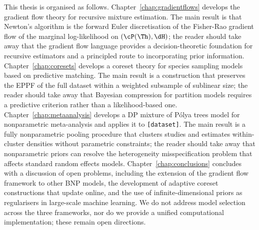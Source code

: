 This thesis is organised as follows.
Chapter~\ref{chap:gradientflows} develops the gradient flow theory for
recursive mixture estimation.  The main result is that Newton's algorithm
is the forward Euler discretisation of the Fisher-Rao gradient flow of the
marginal log-likelihood on $(\cP(\Th), \dH)$; the reader should take away
that the gradient flow language provides a decision-theoretic foundation
for recursive estimators and a principled route to incorporating prior
information.
Chapter~\ref{chap:coresets} develops a coreset theory for species sampling
models based on predictive matching.  The main result is a construction
that preserves the EPPF of the full dataset within a weighted subsample of
sublinear size; the reader should take away that Bayesian compression for
partition models requires a predictive criterion rather than a
likelihood-based one.
Chapter~\ref{chap:metaanalysis} develops a DP mixture of P\'{o}lya trees
model for nonparametric meta-analysis and applies it to \texttt{[dataset]}.
The main result is a fully nonparametric pooling procedure that clusters
studies and estimates within-cluster densities without parametric
constraints; the reader should take away that nonparametric priors can
resolve the heterogeneity misspecification problem that affects standard
random effects models.
Chapter~\ref{chap:conclusions} concludes with a discussion of open
problems, including the extension of the gradient flow framework to other
BNP models, the development of adaptive coreset constructions that update
online, and the use of infinite-dimensional priors as regularisers in
large-scale machine learning.  We do not address model selection across the
three frameworks, nor do we provide a unified computational implementation;
these remain open directions.


